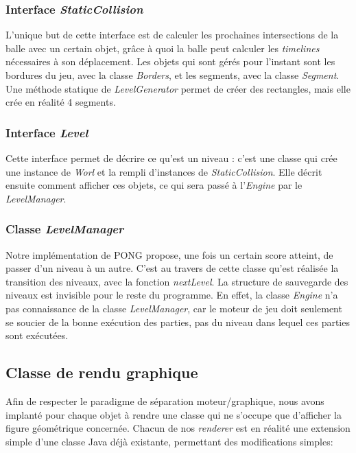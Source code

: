 \documentclass[a4paper,10pt]{article}
\theoremstyle{definition}
\begin{document}
        \subsubsection*{Interface \emph{StaticCollision}}
	L'unique but de cette interface est de calculer les prochaines intersections de la balle avec un certain objet, grâce à quoi la balle peut calculer les \emph{timelines} nécessaires à son déplacement. Les objets qui sont gérés pour l'instant sont les bordures du jeu, avec la classe \emph{Borders}, et les segments, avec la classe \emph{Segment}. Une méthode statique de \emph{LevelGenerator} permet de créer des rectangles, mais elle crée en réalité 4 segments.
        
	\subsubsection*{Interface \emph{Level}}
	Cette interface permet de décrire ce qu'est un niveau : c'est une classe qui crée une instance de \emph{Worl} et la rempli d'instances de \emph{StaticCollision}. Elle décrit ensuite comment afficher ces objets, ce qui sera passé à l'\emph{Engine} par le \emph{LevelManager}.
        
        \subsubsection*{Classe \emph{LevelManager}}
	Notre implémentation de PONG propose, une fois un certain score atteint, de passer d'un niveau à un autre. C'est au travers de cette classe qu'est réalisée la transition des niveaux, avec la fonction \emph{nextLevel}. La structure de sauvegarde des niveaux est invisible pour le reste du programme. En effet, la classe \emph{Engine} n'a pas connaissance de la classe \emph{LevelManager}, car le moteur de jeu doit seulement se soucier de la bonne exécution des parties, pas du niveau dans lequel ces parties sont exécutées.
        
        
    \subsection{Classe de rendu graphique}
    Afin de respecter le paradigme de séparation moteur/graphique, nous avons implanté pour chaque objet à rendre une classe qui ne s'occupe que d'afficher la figure géométrique concernée. Chacun de nos \emph{renderer} est en réalité une extension simple d'une classe Java déjà existante, permettant des modifications simples:
    
\end{document}
